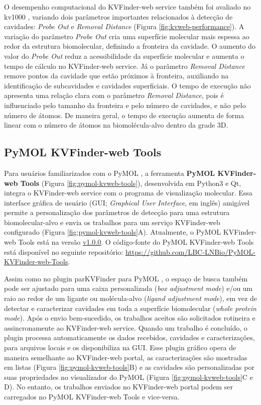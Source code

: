 \documentclass[Portugues]{phdquali}
\begin{document}
O desempenho computacional do KVFinder-web service também foi avaliado no kv1000 \cite{guerra2020}, variando dois parâmetros importantes relacionados à detecção de cavidades: \textit{Probe Out} e \textit{Removal Distance} (Figura \ref{fig:kvweb-performance}). A variação do parâmetro \textit{Probe Out} cria uma superfície molecular mais espessa ao redor da estrutura biomolecular, definindo a fronteira da cavidade. O aumento do valor do \textit{Probe Out} reduz a acessibilidade da superfície molecular e aumenta o tempo de cálculo no KVFinder-web service. Já o parâmetro \textit{Removal Distance} remove pontos da cavidade que estão próximos à fronteira, auxiliando na identificação de subcavidades e cavidades superficiais. O tempo de execução não apresenta uma relação clara com o parâmetro \textit{Removal Distance}, pois é influenciado pelo tamanho da fronteira e pelo número de cavidades, e não pelo número de átomos. De maneira geral, o tempo de execução aumenta de forma linear com o número de átomos na biomolécula-alvo dentro da grade 3D.

\subsection{PyMOL KVFinder-web Tools}

Para usuários familiarizados com o PyMOL \cite{pymol}, a ferramenta \textbf{PyMOL KVFinder-web Tools} (Figura \ref{fig:pymol-kvweb-tools}), desenvolvida em Python3 e Qt, integra o KVFinder-web service com o programa de visualização molecular. Essa interface gráfica de usuário (GUI; \textit{Graphical User Interface}, em inglês) amigável permite a personalização dos parâmetros de detecção para uma estrutura biomolecular-alvo e envia os trabalhos para um serviço KVFinder-web configurado (Figura \ref{fig:pymol-kvweb-tools}A). Atualmente, o PyMOL KVFinder-web Tools está na versão \href{https://github.com/LBC-LNBio/PyMOL-KVFinder-web-Tools/tree/v1.0.0}{v1.0.0}. O código-fonte do PyMOL KVFinder-web Tools está disponível no seguinte repositório: \url{https://github.com/LBC-LNBio/PyMOL-KVFinder-web-Tools}.

Assim como no plugin parKVFinder para PyMOL \cite{guerra2020}, o espaço de busca também pode ser ajustado para uma caixa personalizada (\textit{box adjustment mode}) e/ou um raio ao redor de um ligante ou molécula-alvo (\textit{ligand adjustment mode}), em vez de detectar e caracterizar cavidades em toda a superfície biomolecular (\textit{whole protein mode}). Após o envio bem-sucedido, os trabalhos aceitos são solicitados rotineira e assincronamente ao KVFinder-web service. Quando um trabalho é concluído, o plugin processa automaticamente os dados recebidos, cavidades e caracterizações, para arquivos locais e os disponibiliza na GUI. Esse plugin gráfico opera de maneira semelhante ao KVFinder-web portal, as caracterizações são mostradas em listas (Figura \ref{fig:pymol-kvweb-tools}B) e as cavidades são personalizadas por suas propriedades no visualizador do PyMOL (Figura \ref{fig:pymol-kvweb-tools}C e D). No entanto, os trabalhos enviados no KVFinder-web portal podem ser carregados no PyMOL KVFinder-web Tools e vice-versa.
\end{document}
